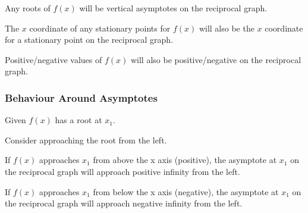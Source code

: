 \documentclass[a4paper,11pt]{article}
\begin{document}
Any roots of $f(x)$ will be vertical asymptotes on the reciprocal graph.

The $x$ coordinate of any stationary points for $f(x)$ will also be the $x$
coordinate for a stationary point on the reciprocal graph.

Positive/negative values of $f(x)$ will also be positive/negative on the
reciprocal graph.


\subsubsection{Behaviour Around Asymptotes}

Given $f(x)$ has a root at $x_1$.

Consider approaching the root from the left.

If $f(x)$ approaches $x_1$ from above the x axis (positive), the asymptote at
$x_1$ on the reciprocal graph will approach positive infinity from the left.

If $f(x)$ approaches $x_1$ from below the x axis (negative), the asymptote at
$x_1$ on the reciprocal graph will approach negative infinity from the left.
\end{document}
